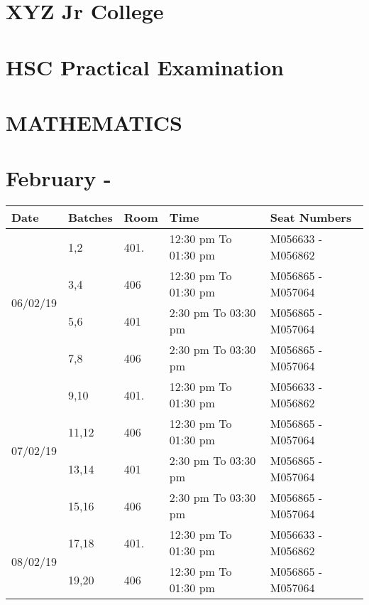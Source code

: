 \documentclass[17pt]{extarticle}
\begin{document}
\section*{XYZ Jr College}
\section*{HSC Practical Examination }
\section*{MATHEMATICS}
\section*{February - \the\year }
\large
\begin{tabular}{ | m{3cm} | m{3cm}|m{3cm}| m{7cm} |  m{7.2cm} | } 
  \hline
  Date
  &Batches
  &Room
  &Time
  & Seat Numbers \\ 
  
   
  \hline
  \multirow{4}{*}{06/02/19 }
  &1,2
  &401.
  &12:30 pm To 01:30 pm 
  &M056633 - M056862 
  \\\cline{2-5}
  
  & 3,4
  &406
  & 12:30 pm To 01:30 pm
  & M056865 - M057064 
  \\\cline{2-5}
  
  & 5,6
  &401
  & 2:30 pm To 03:30 pm
  & M056865 - M057064 
  \\\cline{2-5}
  
  & 7,8
  &406
  & 2:30 pm To 03:30 pm
  & M056865 - M057064
  \\ 
  \hline


   
  
  \multirow{4}{*}{07/02/19 }
  &9,10
  &401.
  &12:30 pm To 01:30 pm 
  &M056633 - M056862 
  \\\cline{2-5}
  
  & 11,12
  &406
  & 12:30 pm To 01:30 pm
  & M056865 - M057064 
  \\\cline{2-5}
  
  & 13,14
  &401
  & 2:30 pm To 03:30 pm
  & M056865 - M057064 
  \\\cline{2-5}
  
  & 15,16
  &406
  & 2:30 pm To 03:30 pm
  & M056865 - M057064
  \\ 
  \hline

   
  
  \multirow{2}{*}{08/02/19 }
  &17,18
  &401.
  &12:30 pm To 01:30 pm 
  &M056633 - M056862 
  \\\cline{2-5}
  
  & 19,20
  &406
  & 12:30 pm To 01:30 pm
  & M056865 - M057064 
 \\ 
  \hline

   

\end{tabular}
\vspace{1.3cm}
\end{document}

